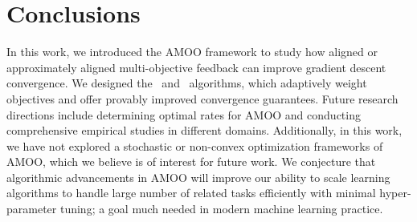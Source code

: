 \section{Conclusions}

In this work, we introduced the AMOO framework to study how aligned or approximately aligned multi-objective feedback can improve gradient descent convergence. We designed the \CAMOO\ and \PAMOO\ algorithms, which adaptively weight objectives and offer provably improved convergence guarantees. Future research directions include determining optimal rates for AMOO and conducting comprehensive empirical studies in different domains. Additionally, in this work, we have not explored a stochastic or non-convex optimization frameworks of AMOO, which we believe is of interest for future work.  We conjecture that algorithmic advancements in AMOO  will improve our ability to scale learning algorithms to handle large number of related tasks efficiently with minimal hyper-parameter tuning; a goal much needed in modern machine learning practice.








